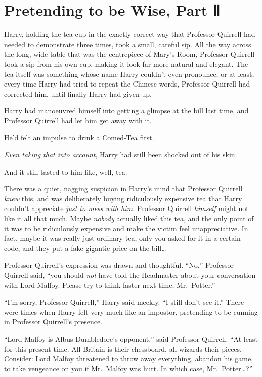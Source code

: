 \chapter{Pretending to be Wise, Part
Ⅱ}\label{pretending-to-be-wise-part}

Harry, holding the tea cup in the exactly correct way that Professor
Quirrell had needed to demonstrate three times, took a small, careful
sip. All the way across the long, wide table that was the centrepiece of
Mary's Room, Professor Quirrell took a sip from his own cup, making it
look far more natural and elegant. The tea itself was something whose
name Harry couldn't even pronounce, or at least, every time Harry had
tried to repeat the Chinese words, Professor Quirrell had corrected him,
until finally Harry had given up.

Harry had manoeuvred himself into getting a glimpse at the bill last
time, and Professor Quirrell had let him get away with it.

He'd felt an impulse to drink a Comed-Tea first.

\emph{Even taking that into account}, Harry had still been shocked out
of his skin.

And it still tasted to him like, well, tea.

There was a quiet, nagging suspicion in Harry's mind that Professor
Quirrell \emph{knew} this, and was deliberately buying ridiculously
expensive tea that Harry couldn't appreciate \emph{just to mess with
him.} Professor Quirrell \emph{himself} might not like it all that much.
Maybe \emph{nobody} actually liked this tea, and the only point of it
was to be ridiculously expensive and make the victim feel
unappreciative. In fact, maybe it was really just ordinary tea, only you
asked for it in a certain code, and they put a fake gigantic price on
the bill\ldots{}

Professor Quirrell's expression was drawn and thoughtful. ``No,''
Professor Quirrell said, ``you should \emph{not} have told the
Headmaster about your conversation with Lord Malfoy. Please try to think
faster next time, Mr.~Potter.''

``I'm sorry, Professor Quirrell,'' Harry said meekly. ``I still don't
see it.'' There were times when Harry felt very much like an impostor,
pretending to be cunning in Professor Quirrell's presence.

``Lord Malfoy is Albus Dumbledore's opponent,'' said Professor Quirrell.
``At least for this present time. All Britain is their chessboard, all
wizards their pieces. Consider: Lord Malfoy threatened to throw away
everything, abandon his game, to take vengeance on you if Mr.~Malfoy was
hurt. In which case, Mr.~Potter\ldots{}?''

